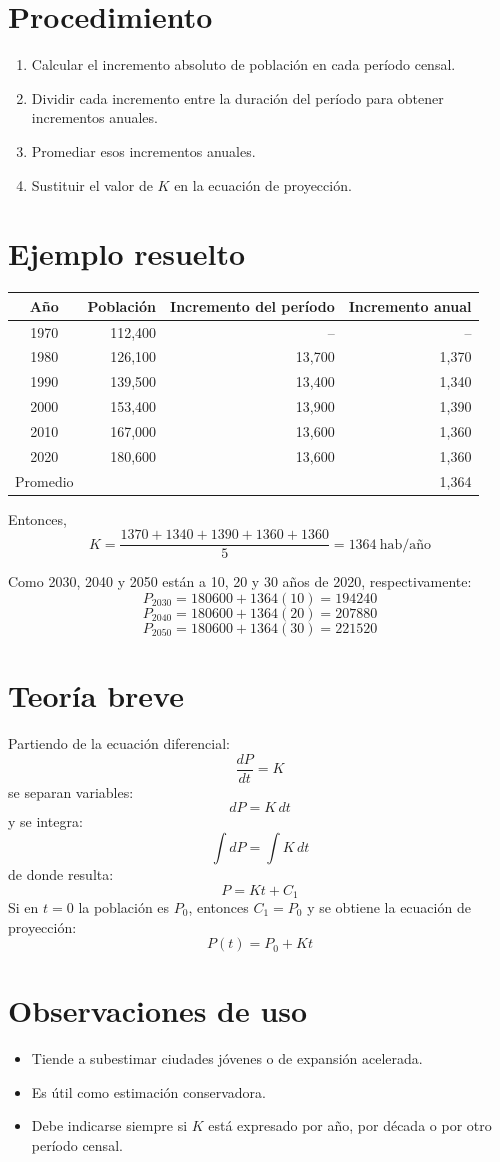 \documentclass[12pt]{article}
\begin{document}
\section{Procedimiento}
\begin{enumerate}
\item Calcular el incremento absoluto de población en cada período censal.
\item Dividir cada incremento entre la duración del período para obtener incrementos anuales.
\item Promediar esos incrementos anuales.
\item Sustituir el valor de $K$ en la ecuación de proyección.
\end{enumerate}

\section{Ejemplo resuelto}
\begin{center}
\begin{tabular}{crrr}
\toprule
Año & Población & Incremento del período & Incremento anual \\
\midrule
1970 & 112,400 & -- & -- \\
1980 & 126,100 & 13,700 & 1,370 \\
1990 & 139,500 & 13,400 & 1,340 \\
2000 & 153,400 & 13,900 & 1,390 \\
2010 & 167,000 & 13,600 & 1,360 \\
2020 & 180,600 & 13,600 & 1,360 \\
\midrule
Promedio & & & 1,364 \\
\bottomrule
\end{tabular}
\end{center}

Entonces,
\[
K=\frac{\num{1370}+\num{1340}+\num{1390}+\num{1360}+\num{1360}}{5}=\num{1364}\ \text{hab/año}
\]

Como 2030, 2040 y 2050 están a 10, 20 y 30 años de 2020, respectivamente:
\[
P_{2030}=\num{180600}+\num{1364}(10)=\num{194240}
\]
\[
P_{2040}=\num{180600}+\num{1364}(20)=\num{207880}
\]
\[
P_{2050}=\num{180600}+\num{1364}(30)=\num{221520}
\]


\section{Teoría breve}
Partiendo de la ecuación diferencial:
\[
\frac{dP}{dt}=K
\]
se separan variables:
\[
dP=K\,dt
\]
y se integra:
\[
\int dP=\int K\,dt
\]
de donde resulta:
\[
P=Kt+C_1
\]
Si en $t=0$ la población es $P_0$, entonces $C_1=P_0$ y se obtiene la ecuación de proyección:
\[
P(t)=P_0+Kt
\]

\section{Observaciones de uso}
\begin{itemize}
\item Tiende a subestimar ciudades jóvenes o de expansión acelerada.
\item Es útil como estimación conservadora.
\item Debe indicarse siempre si $K$ está expresado por año, por década o por otro período censal.
\end{itemize}
\end{document}
